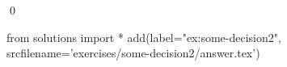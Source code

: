 
\begin{ex} 
  \label{ex:some-decision2}
  
  \qed
\end{ex} 
\begin{python0}
from solutions import *
add(label="ex:some-decision2",
    srcfilename='exercises/some-decision2/answer.tex') 
\end{python0}

